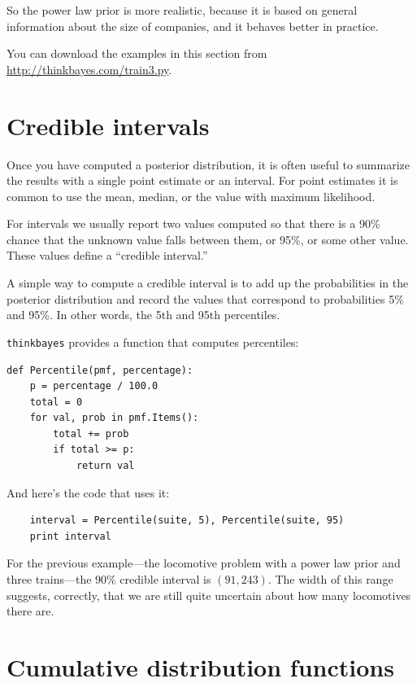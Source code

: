 \documentclass[12pt]{book}
\begin{document}
So the power law prior is more realistic, because it is based on
general information about the size of companies, and it
behaves better in practice.

You can download the examples in this section from
\url{http://thinkbayes.com/train3.py}.


\section{Credible intervals}

Once you have computed a posterior distribution, it is often useful
to summarize the results with a single point estimate or an interval.
For point estimates it is common to use the mean, median, or the
value with maximum likelihood.

For intervals we usually report two values computed
so that there is a 90\% chance that the unknown value falls
between them, or 95\%, or some other value.
These values define a ``credible interval.''

A simple way to compute a credible interval is to add up the
probabilities in the posterior distribution and record the values
that correspond to probabilities 5\% and 95\%.  In other words,
the 5th and 95th percentiles.

\verb"thinkbayes" provides a function that computes percentiles:

\begin{verbatim}
def Percentile(pmf, percentage):
    p = percentage / 100.0
    total = 0
    for val, prob in pmf.Items():
        total += prob
        if total >= p:
            return val    
\end{verbatim}

And here's the code that uses it:

\begin{verbatim}
    interval = Percentile(suite, 5), Percentile(suite, 95)
    print interval
\end{verbatim}

For the previous example---the locomotive problem with a power law prior
and three trains---the 90\% credible interval is $(91, 243)$.  The
width of this range suggests, correctly, that we are still quite
uncertain about how many locomotives there are.


\section{Cumulative distribution functions}
\end{document}
